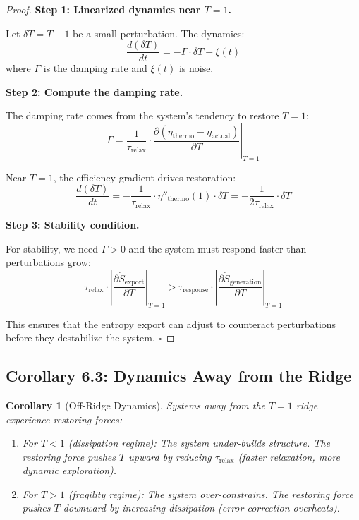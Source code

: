 \documentclass[11pt,a4paper]{article}
\newtheorem{corollary}[theorem]{Corollary}
\begin{document}
\begin{proof}
\textbf{Step 1: Linearized dynamics near $T = 1$.}

Let $\delta T = T - 1$ be a small perturbation. The dynamics:
\begin{equation}
\frac{d(\delta T)}{dt} = -\Gamma \cdot \delta T + \xi(t)
\end{equation}
where $\Gamma$ is the damping rate and $\xi(t)$ is noise.

\textbf{Step 2: Compute the damping rate.}

The damping rate comes from the system's tendency to restore $T = 1$:
\begin{equation}
\Gamma = \frac{1}{\tau_{\text{relax}}} \cdot \left.\frac{\partial (\eta_{\text{thermo}} - \eta_{\text{actual}})}{\partial T}\right|_{T=1}
\end{equation}

Near $T = 1$, the efficiency gradient drives restoration:
\begin{equation}
\frac{d(\delta T)}{dt} = -\frac{1}{\tau_{\text{relax}}} \cdot \eta''_{\text{thermo}}(1) \cdot \delta T = -\frac{1}{2\tau_{\text{relax}}} \cdot \delta T
\end{equation}

\textbf{Step 3: Stability condition.}

For stability, we need $\Gamma > 0$ and the system must respond faster than perturbations grow:
\begin{equation}
\tau_{\text{relax}} \cdot \left|\frac{\partial \dot{S}_{\text{export}}}{\partial T}\right|_{T=1} > \tau_{\text{response}} \cdot \left|\frac{\partial \dot{S}_{\text{generation}}}{\partial T}\right|_{T=1}
\end{equation}

This ensures that the entropy export can adjust to counteract perturbations before they destabilize the system. \hfill $\square$
\end{proof}

\subsection{Corollary 6.3: Dynamics Away from the Ridge}

\begin{corollary}[Off-Ridge Dynamics]
Systems away from the $T = 1$ ridge experience restoring forces:
\begin{enumerate}[label=(\roman*)]
\item For $T < 1$ (dissipation regime): The system under-builds structure. The restoring force pushes $T$ upward by reducing $\tau_{\text{relax}}$ (faster relaxation, more dynamic exploration).
\item For $T > 1$ (fragility regime): The system over-constrains. The restoring force pushes $T$ downward by increasing dissipation (error correction overheats).
\end{enumerate}
\end{corollary}
\end{document}
